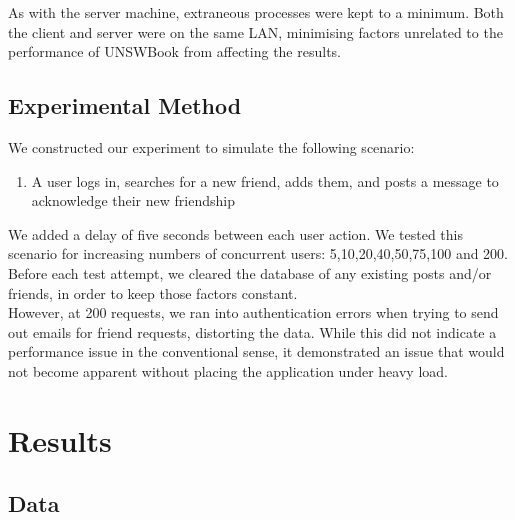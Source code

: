 \documentclass[11pt]{report}
\begin{document}
As with the server machine, extraneous processes were kept to a minimum. Both the client and server were on the same LAN, minimising factors unrelated to the performance of UNSWBook from affecting the results.

\section{Experimental Method}
We constructed our experiment to simulate the following scenario:

\begin{enumerate}
\item{A user logs in, searches for a new friend, adds them, and posts a message to acknowledge their new friendship}
\end{enumerate}

We added a delay of five seconds between each user action. We tested this scenario for increasing numbers of concurrent users: 5,10,20,40,50,75,100 and 200. Before each test attempt, we cleared the database of any existing posts and/or friends, in order to keep those factors constant. \\

However, at 200 requests, we ran into authentication errors when trying to send out emails for friend requests, distorting the data. While this did not indicate a performance issue in the conventional sense, it demonstrated an issue that would not become apparent without placing the application under heavy load. 

\chapter{Results}
\section{Data}
\end{document}
